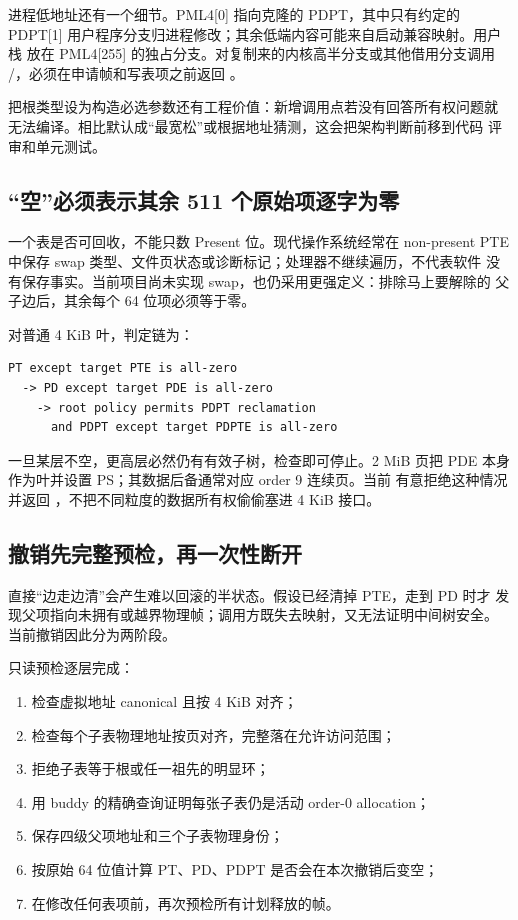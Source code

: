 进程低地址还有一个细节。PML4[0] 指向克隆的 PDPT，其中只有约定的
PDPT[1] 用户程序分支归进程修改；其余低端内容可能来自启动兼容映射。用户栈
放在 PML4[255] 的独占分支。对复制来的内核高半分支或其他借用分支调用
/，必须在申请帧和写表项之前返回
。

把根类型设为构造必选参数还有工程价值：新增调用点若没有回答所有权问题就
无法编译。相比默认成“最宽松”或根据地址猜测，这会把架构判断前移到代码
评审和单元测试。

\subsection{“空”必须表示其余 511 个原始项逐字为零}

一个表是否可回收，不能只数 Present 位。现代操作系统经常在 non-present
PTE 中保存 swap 类型、文件页状态或诊断标记；处理器不继续遍历，不代表软件
没有保存事实。当前项目尚未实现 swap，也仍采用更强定义：排除马上要解除的
父子边后，其余每个 64 位项必须等于零。

对普通 4 KiB 叶，判定链为：

\begin{verbatim}
PT except target PTE is all-zero
  -> PD except target PDE is all-zero
    -> root policy permits PDPT reclamation
      and PDPT except target PDPTE is all-zero
\end{verbatim}

一旦某层不空，更高层必然仍有有效子树，检查即可停止。2 MiB 页把 PDE 本身
作为叶并设置 PS；其数据后备通常对应 order 9 连续页。当前
 有意拒绝这种情况并返回
，不把不同粒度的数据所有权偷偷塞进 4 KiB
接口。

\subsection{撤销先完整预检，再一次性断开}

直接“边走边清”会产生难以回滚的半状态。假设已经清掉 PTE，走到 PD 时才
发现父项指向未拥有或越界物理帧；调用方既失去映射，又无法证明中间树安全。
当前撤销因此分为两阶段。

只读预检逐层完成：

\begin{enumerate}[label=\arabic*.]
  \item 检查虚拟地址 canonical 且按 4 KiB 对齐；
  \item 检查每个子表物理地址按页对齐，完整落在允许访问范围；
  \item 拒绝子表等于根或任一祖先的明显环；
  \item 用 buddy 的精确查询证明每张子表仍是活动 order-0 allocation；
  \item 保存四级父项地址和三个子表物理身份；
  \item 按原始 64 位值计算 PT、PD、PDPT 是否会在本次撤销后变空；
  \item 在修改任何表项前，再次预检所有计划释放的帧。
\end{enumerate}

